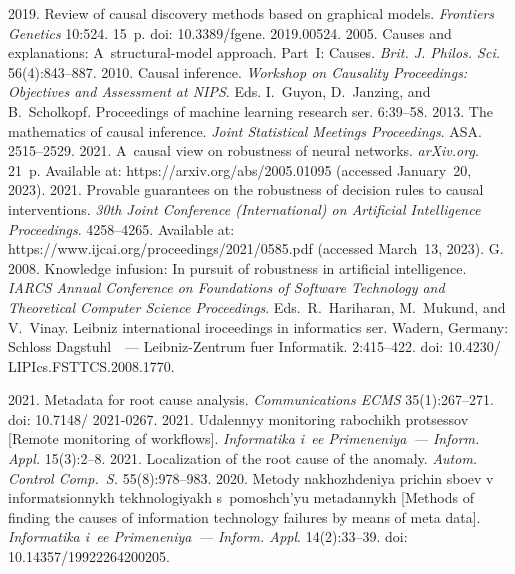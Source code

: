   \begin{multicols}{2}

\renewcommand{\bibname}{\protect\rmfamily References}

{\small\frenchspacing
 {%
 \begin{thebibliography}{99}
 2019. Review of causal discovery methods based on 
graphical models. \textit{Frontiers Genetics} 10:524. 15~p. doi: 10.3389/fgene. 2019.00524. 
 2005. Causes and explanations: A~structural-model approach. 
Part~I: Causes. \textit{Brit. J. Philos. Sci.} 56(4):843--887. 
 2010. Causal inference. \textit{Workshop on Causality Proceedings: Objectives and 
Assessment at NIPS}. Eds. I.~Guyon, D.~Janzing, and B.~Scholkopf. Proceedings of machine learning 
research ser. 6:39--58. 
 2013. The mathematics of causal inference. \textit{Joint Statistical Meetings 
Proceedings}. ASA. 2515--2529.
 2021. A~causal view on robustness of neural networks. 
\textit{arXiv.org}. 21~p. Available at: {\sf https://arxiv.org/abs/2005.01095} (accessed January~20, 
2023).
 2021. Provable guarantees on the robustness of 
decision rules to causal interventions. \textit{30th Joint Conference (International) on Artificial 
Intelligence Proceedings}. 4258--4265. Available at: {\sf 
https://www.ijcai.org/proceedings/2021/0585.pdf} (accessed March~13, 2023).
 G. 2008. Knowledge infusion: In pursuit of robustness in artificial intelligence. 
\textit{IARCS  Annual Conference on Foundations of Software Technology and Theoretical Computer Science 
Proceedings}. 
Eds.\ R.~Hariharan, M.~Mukund, and V.~Vinay.
Leibniz international iroceedings in informatics ser. Wadern, Germany: Schloss 
Dagstuhl~~--- Leibniz-Zentrum fuer Informatik. 2:415--422. doi: 10.4230/ LIPIcs.FSTTCS.2008.1770.

 2021. Metadata for 
root cause analysis. \textit{Communications ECMS} 35(1):267--271. doi: 10.7148/ 2021-0267.
 2021. Udalennyy monitoring 
rabochikh protsessov [Remote monitoring of workflows]. \textit{Informatika i~ee Primeneniya~--- 
Inform. Appl.} 15(3):2--8.
 2021. Localization of the root cause 
of the anomaly. \textit{Autom. Control Comp.~S.} 55(8):978--983.
 2020. Metody 
nakhozhdeniya prichin sboev v informatsionnykh tekhnologiyakh s~pomoshch'yu metadannykh 
[Methods of finding the causes of information technology failures by means of meta data]. 
\textit{Informatika i~ee Primeneniya~--- Inform. Appl}. 14(2):33--39. doi: 10.14357/19922264200205.
 

\end{thebibliography}}}
\end{multicols}
